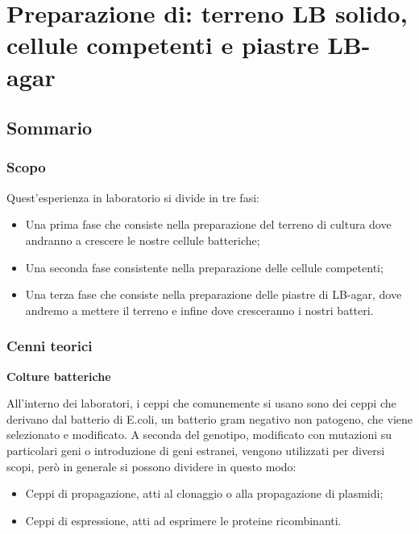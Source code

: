 \chapter{Preparazione di:  terreno LB solido, cellule competenti e piastre LB-agar }

\vspace{0.6cm}


\section{Sommario}

\subsection{Scopo}

Quest'esperienza in laboratorio si divide in tre fasi:
\begin{itemize}
  \item Una prima fase che consiste nella preparazione del terreno di cultura dove
  andranno a crescere le nostre cellule batteriche;
  \item Una seconda fase consistente nella preparazione delle cellule competenti;
  \item Una terza fase che consiste nella preparazione delle piastre di LB-agar,
  dove andremo a mettere il terreno e infine dove cresceranno i nostri batteri.
\end{itemize}


\subsection{Cenni teorici}

\textbf{Colture batteriche}
\vspace{0.3cm}

All'interno dei laboratori, i ceppi che comunemente si usano sono dei ceppi
che derivano dal batterio di E.coli, un batterio gram negativo non patogeno,
che viene selezionato e modificato.
A seconda del genotipo, modificato con mutazioni su particolari geni o introduzione
di geni estranei, vengono utilizzati per diversi scopi, però in generale si possono dividere in questo modo:
\begin{itemize}
  \item Ceppi di propagazione, atti al clonaggio o alla propagazione di plasmidi;
  \item Ceppi di espressione, atti ad esprimere le proteine ricombinanti.
\end{itemize}

